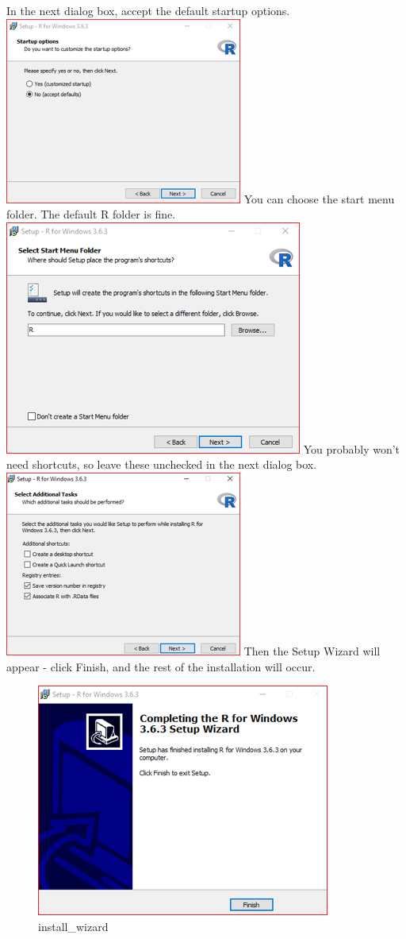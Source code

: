 \documentclass[
]{book}
\begin{document}
In the next dialog box, accept the default startup options.
\includegraphics{images/installrdefaults.png}
You can choose the start menu folder. The default R folder is fine.
\includegraphics{images/installrstartmenu.png}
You probably won't need shortcuts, so leave these unchecked in the next dialog box.
\includegraphics{images/installraddltasks.png}
Then the Setup Wizard will appear - click Finish, and the rest of the installation will occur.

\begin{figure}
\centering
\includegraphics{images/installrwizard.png}
\caption{install\_wizard}
\end{figure}
\end{document}
